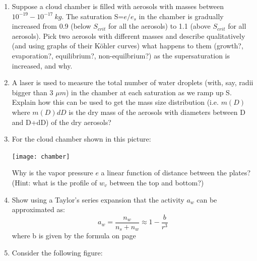 \documentclass[12pt]{article}
\begin{document}
\begin{enumerate}
\item Suppose a cloud chamber is filled with aerosols with masses
between $10^{-19} - 10^{-17}\ kg$.   The saturation S=$e/e_s$ in the
chamber is gradually increased from 0.9 (below $S_{crit}$ for all the
aerosols) to 1.1 (above $S_{crit}$ for all aerosols).  Pick two
aerosols with different masses and describe qualitatively (and using
graphs of their K\"ohler curves) what happens to them
(growth?, evaporation?, equilibrium?, non-equilbrium?)  as the
supersaturation is increased, and why.

\item A laser is used to measure the total number of water droplets
(with, say, radii bigger than 3 $\mu m$) in the
chamber at each saturation as we ramp up S.  Explain how this can be used to
get the mass size distribution (i.e. $m(D)$ where $m(D)dD$ is the dry
mass of the aerosols with diameters between D and D+dD) of the dry
aerosols?


\item For the cloud chamber shown in this picture:

\texttt{[image: chamber]}

Why is the vapor pressure $e$ a linear function of distance between
the plates?  (Hint:  what is the profile of $w_v$ between the top
and bottom?)

\item  Show using a Taylor's series expansion that the activity $a_w$ can be approximated as: 
  \begin{equation}
    \label{eq:aw}
    a_w = \frac{n_w}{n_s + n_w} \approx 1 - \frac{b}{r^3}
  \end{equation}
where b is given by the formula on page~\pageref{constants}



\item Consider the following figure:

\vspace{-1in}


\end{enumerate}
\end{document}
